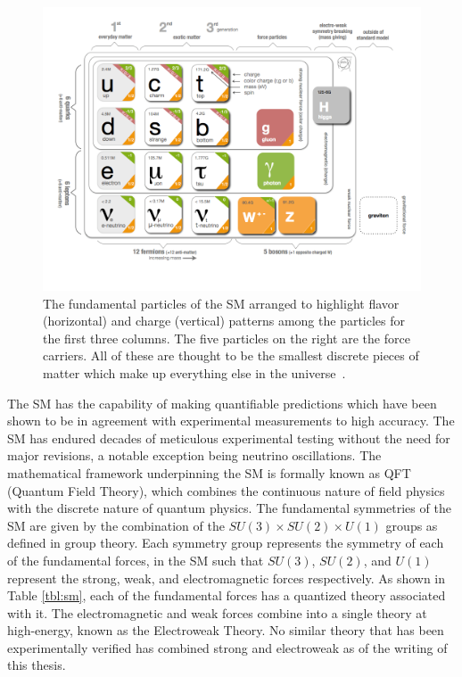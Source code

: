 \begin{figure}[!ht]
\centering
\includegraphics[width=0.75\linewidth]{figs/standard_model_chart.png}
\caption{The fundamental particles of the SM arranged to highlight flavor (horizontal) and charge (vertical) patterns among the particles for the first three columns. The five particles on the right are the force carriers. All of these are thought to be the smallest discrete pieces of matter which make up everything else in the universe~\cite{PhysRevD.86.010001}.}
\label{fig:stnd_mdl_chart}
\end{figure}

The SM has the capability of making quantifiable predictions which have been shown to be in agreement with experimental measurements to high accuracy. The SM has endured decades of meticulous experimental testing without the need for major revisions, a notable exception being neutrino oscillations. The mathematical framework underpinning the SM is formally known as QFT (Quantum Field Theory), which combines the continuous nature of field physics with the discrete nature of quantum physics. 
The fundamental symmetries of the SM are given by the combination of the $SU(3)\times SU(2)\times U(1)$ groups as defined in group theory. Each symmetry group represents the symmetry of each of the fundamental forces, in the SM such that $SU(3)$, $SU(2)$, and $U(1)$ represent the strong, weak, and electromagnetic forces respectively. As shown in Table \ref{tbl:sm}, each of the fundamental forces has a quantized theory associated with it. The electromagnetic and weak forces combine into a single theory at high-energy, known as the Electroweak Theory. No similar theory that has been experimentally verified has combined strong and electroweak as of the writing of this thesis.

